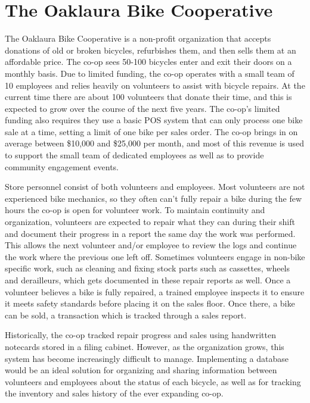 \documentclass{article}
\begin{document}
\section{The Oaklaura Bike Cooperative}

\begin{tcolorbox}[colback=secondarycolor, colframe=primarycolor, arc=5mm]
\begingroup
\large
The Oaklaura Bike Cooperative is a non-profit organization that accepts donations of old or broken bicycles, refurbishes them, and then sells them at an affordable price. The co-op sees 50-100 bicycles enter and exit their doors on a monthly basis. Due to limited funding, the co-op operates with a small team of 10 employees and relies heavily on volunteers to assist with bicycle repairs. At the current time there are about 100 volunteers that donate their time, and this is expected to grow over the course of the next five years. The co-op’s limited funding also requires they use a basic POS system that can only process one bike sale at a time, setting a limit of one bike per sales order. The co-op brings in on average between \$10,000 and \$25,000 per month, and most of this revenue is used to support the small team of dedicated employees as well as to provide community engagement events. 

\vspace{0.2cm}

Store personnel consist of both volunteers and employees. Most volunteers are not experienced bike mechanics, so they often can't fully repair a bike during the few hours the co-op is open for volunteer work. To maintain continuity and organization, volunteers are expected to repair what they can during their shift and document their progress in a report the same day the work was performed. This allows the next volunteer and/or employee to review the logs and continue the work where the previous one left off. Sometimes volunteers engage in non-bike specific work, such as cleaning and fixing stock parts such as cassettes, wheels and derailleurs, which gets documented in these repair reports as well. Once a volunteer believes a bike is fully repaired, a trained employee inspects it to ensure it meets safety standards before placing it on the sales floor. Once there, a bike can be sold, a transaction which is tracked through a sales report. 

\vspace{0.2cm}

Historically, the co-op tracked repair progress and sales using handwritten notecards stored in a filing cabinet. However, as the organization grows, this system has become increasingly difficult to manage. Implementing a database would be an ideal solution for organizing and sharing information between volunteers and employees about the status of each bicycle, as well as for tracking the inventory and sales history of the ever expanding co-op.

\endgroup
\end{tcolorbox}
\end{document}
